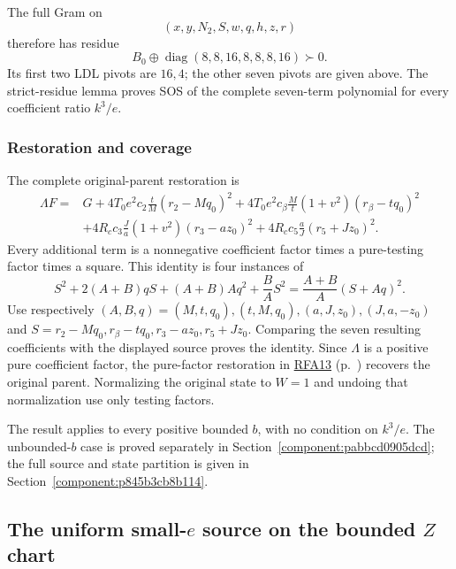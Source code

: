 The full Gram on
\[
\boxed{(x,y,N_2,S,w,q,h,z,r)}
\]
therefore has residue
\[
\boxed{B_0\oplus\operatorname{diag}(8,8,16,8,8,8,16)\succ0.}
\]
Its first two LDL pivots are $16,4$; the other seven pivots are given above. The strict-residue lemma proves SOS of the complete seven-term polynomial for every coefficient ratio $k^3/e$.

\subsubsection*{Restoration and coverage}
The complete original-parent restoration is
\begin{align*}
\Lambda F={}&G
+4T_0e^2c_2\frac{t}{M}(r_2-Mq_0)^2
+4T_0e^2c_\beta\frac{M}{t}(1+v^2)(r_\beta-tq_0)^2\\
&+4R_cc_3\frac{J}{a}(1+v^2)(r_3-az_0)^2
+4R_cc_5\frac{a}{J}(r_5+Jz_0)^2.
\end{align*}
Every additional term is a nonnegative coefficient factor times a pure-testing factor times a square. This identity is four instances of
\[
S^2+2(A+B)qS+(A+B)Aq^2+\frac BA S^2
=\frac{A+B}{A}(S+Aq)^2.
\]
Use respectively $(A,B,q)=(M,t,q_0),(t,M,q_0),(a,J,z_0),(J,a,-z_0)$ and $S=r_2-Mq_0,r_\beta-tq_0,r_3-az_0,r_5+Jz_0$. Comparing the seven resulting coefficients with the displayed source proves the identity. Since $\Lambda$ is a positive pure coefficient factor, the pure-factor restoration in \hyperref[component:p9b00698ff36a]{RFA13} (p.~\pageref{component:p9b00698ff36a}) recovers the original parent. Normalizing the original state to $W=1$ and undoing that normalization use only testing factors.

The result applies to every positive bounded $b$, with no
condition on $k^3/e$. The unbounded-$b$ case is proved separately in
Section~\ref{component:pabbcd0905dcd}; the full source and state partition
is given in Section~\ref{component:p845b3cb8b114}.


\subsection{The uniform small-$e$ source on the bounded $Z$ chart}

\label{component:pa4f6d1e57f34}

\label{pa4f6d1e57f34:sec:uniform-c1-z-new}

